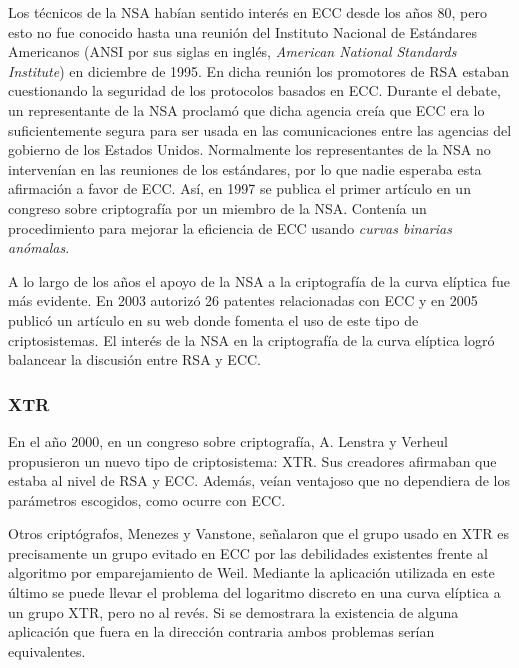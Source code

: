 \documentclass[
  a4paper,
  12pt,
  spanish,
]{scrartcl}
\begin{document}
Los técnicos de la NSA habían sentido interés en ECC desde los años 80, pero esto no fue conocido hasta una reunión del Instituto Nacional de Estándares Americanos (ANSI por sus siglas en inglés, \textit{American National Standards Institute}) en diciembre de 1995. En dicha reunión los promotores de RSA estaban cuestionando la seguridad de los protocolos basados en ECC. Durante el debate, un representante de la NSA proclamó que dicha agencia creía que ECC era lo suficientemente segura para ser usada en las comunicaciones entre las agencias del gobierno de los Estados Unidos. Normalmente los representantes de la NSA no intervenían en las reuniones de los estándares, por lo que nadie esperaba esta afirmación a favor de ECC. Así, en 1997 se publica el primer artículo en un congreso sobre criptografía por un miembro de la NSA. Contenía un procedimiento para mejorar la eficiencia de ECC usando \textit{curvas binarias anómalas}.

A lo largo de los años el apoyo de la NSA a la criptografía de la curva elíptica fue más evidente. En 2003 autorizó 26 patentes relacionadas con ECC y en 2005 publicó un artículo en su web donde fomenta el uso de este tipo de criptosistemas. El interés de la NSA en la criptografía de la curva elíptica logró balancear la discusión entre RSA y ECC.

\subsubsection{XTR}

En el año 2000, en un congreso sobre criptografía, A. Lenstra y Verheul propusieron un nuevo tipo de criptosistema: XTR. Sus creadores afirmaban que estaba al nivel de RSA y ECC. Además, veían ventajoso que no dependiera de los parámetros escogidos, como ocurre con ECC.

Otros criptógrafos, Menezes y Vanstone, señalaron que el grupo usado en XTR es precisamente un grupo evitado en ECC por las debilidades existentes frente al algoritmo por emparejamiento de Weil. Mediante la aplicación utilizada en este último se puede llevar el problema del logaritmo discreto en una curva elíptica a un grupo XTR, pero no al revés. Si se demostrara la existencia de alguna aplicación que fuera en la dirección contraria ambos problemas serían equivalentes. 
\end{document}
